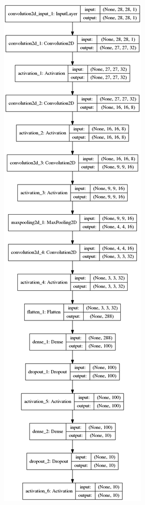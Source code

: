\documentclass[tikz,10pt]{beamer}
\begin{document}
\begin{frame}
\begin{figure}
\begin{minipage}{.33\textwidth}
		\includegraphics[width=.4\linewidth, height=.9\textheight]{images/resultados/network_1/model}
	\end{minipage}%
	\begin{minipage}{.34\textwidth}
	\centering

\end{minipage}
\end{figure}
\end{frame}
\end{document}
